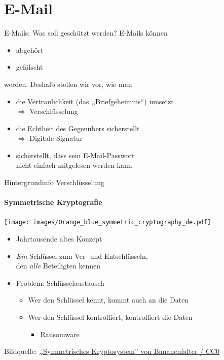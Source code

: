 \section{E-Mail}
\begin{frame}{E-Mails: Was soll geschützt werden?}
  E-Mails können
  \begin{itemize}
    \item abgehört
    \item gefälscht
  \end{itemize}
  werden. \pause Deshalb stellen wir vor, wie man
  \begin{itemize}
      \pause
    \item die Vertraulichkeit (das ,,Briefgeheimnis``) umsetzt
    \\ $\Rightarrow$ Verschlüsselung
    \pause
    \item die Echtheit des Gegenübers sicherstellt
    \\ $\Rightarrow$ Digitale Signatur
    \pause
    \item sicherstellt, dass sein E-Mail-Passwort\\ nicht einfach mitgelesen werden kann
  \end{itemize}
\end{frame}

\begin{frame}{Hintergrundinfo Verschlüsselung}
  \framesubtitle{Symmetrische Kryptografie}
  \begin{center}
    \texttt{[image: images/Orange\_blue\_symmetric\_cryptography\_de.pdf]}
  \end{center}
  \begin{itemize}
    \item Jahrtausende altes Konzept
    \item \emph{Ein} Schlüssel zum Ver- und Entschlüsseln,\\den \emph{alle} Beteiligten kennen
    \item Problem: Schlüsselaustausch
    \begin{itemize}
      \item Wer den Schlüssel kennt, kommt auch an die Daten
      \item Wer den Schlüssel kontrolliert, kontrolliert die Daten
      \begin{itemize}
        \item Ransomware
      \end{itemize}
    \end{itemize}
  \end{itemize}
  \tiny Bildquelle: \href{https://de.wikipedia.org/wiki/Datei:Orange_blue_symmetric_cryptography_de.svg}{,,Symmetrisches Kryptosystem'' von Bananenfalter / CC0}
\end{frame}

